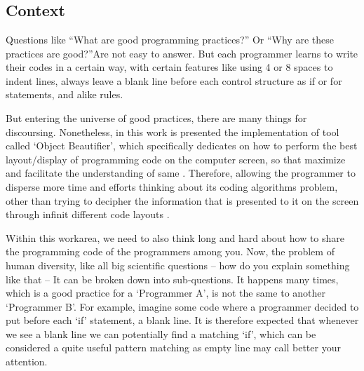 

%


\chapter{}


\begin{englishtext}

    \section{Context}

    Questions like ``What are good programming practices?'' Or ``Why are these
    practices are good?''Are not easy to answer. But each programmer learns to
    write their codes in a certain way, with certain features like using 4 or 8
    spaces to indent lines, always leave a blank line before each control
    structure as if or for statements, and alike rules.
    \cite{naturalCodingConventions}

    But entering the universe of good practices, there are many things for
    discoursing. Nonetheless, in this work is presented the implementation of
    tool called `Object Beautifier', which specifically dedicates on how to
    perform the best layout/display of programming code on the computer screen,
    so that maximize and facilitate the understanding of same
    \cite{automaticSynthesis}.
    Therefore, allowing the programmer to disperse
    more time and efforts thinking about its coding algorithms problem,
    other than trying to decipher the information that is presented
    to it on the screen through infinit different code layouts
    \cite{usingVersionControlData}.

    Within this work\s area, we need to also think long and hard about how to
    share the programming code of the programmers among you. Now, the problem of
    human diversity, like all big scientific questions -- how do you explain
    something like that -- It can be broken down into sub-questions. It happens
    many times, which is a good practice for a `Programmer A', is not the same
    to another `Programmer B'. For example, imagine some code where a programmer
    decided to put before each `if' statement, a blank line. It is therefore
    expected that whenever we see a blank line we can potentially find a
    matching `if', which can be considered a quite useful pattern matching as
    empty line may call better your attention. \cite{aPrettyGoodFormatting}


\end{englishtext}
